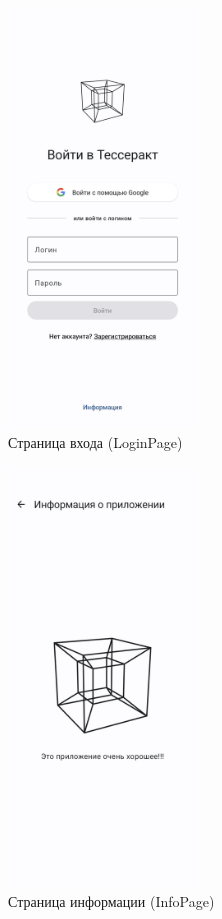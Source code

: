 \documentclass[a4paper, 14pt]{article}
\begin{document}
\begin{figure}[H]
    \centering
    \includegraphics[width=5cm]{resources/4.png}
    \caption{Страница входа (LoginPage)}
\end{figure}

\begin{figure}[H]
    \centering
    \includegraphics[width=5cm]{resources/5.png}
    \caption{Страница информации (InfoPage)}
\end{figure}
\end{document}
